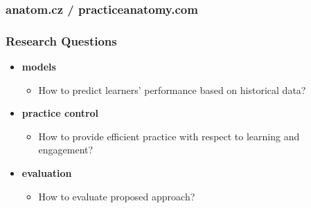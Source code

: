 \documentclass[xcolor=svgnames]{beamer}
\begin{document}
\begin{frame}
	\frametitle{anatom.cz / practiceanatomy.com}
\end{frame}
\begin{frame}
	\frametitle{Research Questions}
	\begin{itemize}
		\item \textbf{models}
			\begin{itemize}
				\item How to predict learners' performance based on historical data?
			\end{itemize}
		\item \textbf{practice control}
			\begin{itemize}
				\item How to provide efficient practice with respect to learning and engagement?
			\end{itemize}
		\item \textbf{evaluation}
			\begin{itemize}
				\item How to evaluate proposed approach?
			\end{itemize}
	\end{itemize}
\end{frame}
\end{document}
